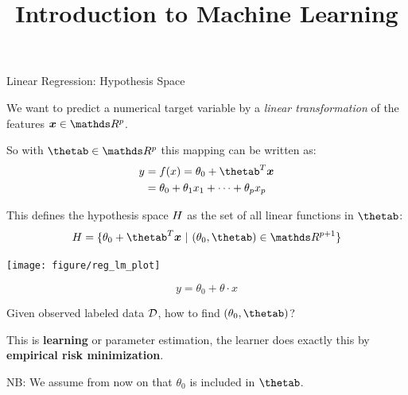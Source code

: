 \documentclass[11pt,compress,t,notes=noshow, xcolor=table]{beamer}
\title{Introduction to Machine Learning}
\institute{\href{https://compstat-lmu.github.io/lecture_i2ml/}{compstat-lmu.github.io/lecture\_i2ml}}
\date{}
\newenvironment{knitrout}{}{} %
\begin{document}


















\begin{vbframe}{Linear Regression: Hypothesis Space}
\lz

We want to predict a numerical target variable by a \emph{linear transformation} of the features $\xv \in \R^p$.

\lz

So with $\thetab \in \R^p$ this mapping can be written as:
\begin{align*}
y &= \fx = \theta_0 + \thetab^T \xv \\
  &= \theta_0 + \theta_1 x_1 + \dots + \theta_p x_p
\end{align*}

\lz

This defines the hypothesis space $H$ as the set of all linear functions in $\thetab$:
\[
\Hspace = \{ \theta_0 + \thetab^T \xv\ |\ (\theta_0, \thetab) \in \R^{p+1} \}
\]

\framebreak

\begin{knitrout}\scriptsize
{}\color{fgcolor}

{\centering \texttt{[image: figure/reg\_lm\_plot]} 

}



\end{knitrout}

\[
y = \theta_0 + \theta \cdot x
\]

\framebreak

\lz

Given observed labeled data $\mathcal{D}$, how to find $(\theta_0, \thetab)$?\\

\lz

This is \textbf{learning} or parameter estimation, the learner does exactly this by \textbf{empirical risk minimization}.

\lz
\lz

NB: We assume from now on that $\theta_0$ is included in $\thetab$.

\end{vbframe}
\end{document}
